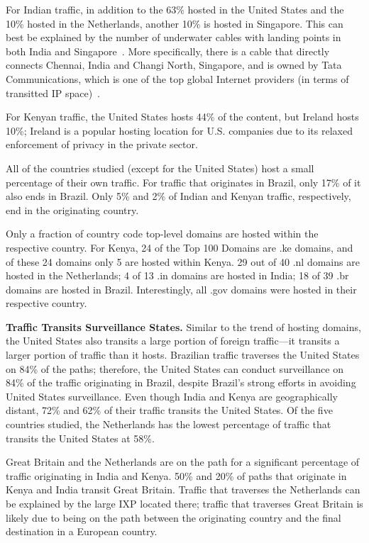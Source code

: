 For Indian traffic, in addition to the 63\% hosted in the United States and the 10\% hosted in the Netherlands, another 10\% is hosted in Singapore.  This can best be explained by the number of underwater cables with landing points in both India and Singapore~\cite{cablemap}.  More specifically, there is a cable that directly connects Chennai, India and Changi North, Singapore, and is owned by Tata Communications, which is one of the top global Internet providers (in terms of transitted IP space)~\cite{bakers}.  

For Kenyan traffic, the United States hosts 44\% of the content, but Ireland hosts 10\%; Ireland is a popular hosting location for U.S. companies due to its relaxed enforcement of privacy in the private sector.  

All of the countries studied (except for the United States) host a small percentage of their own traffic.  For traffic that originates in Brazil, only 17\% of it also ends in Brazil.  Only 5\% and 2\% of Indian and Kenyan traffic, respectively, end in the originating country.  

Only a fraction of country code top-level domains are hosted within the respective country.  For Kenya, 24 of the Top 100 Domains are .ke domains, and of these 24 domains only 5 are hosted within Kenya.  29 out of 40 .nl domains are hosted in the Netherlands; 4 of 13 .in domains are hosted in India; 18 of 39 .br domains are hosted in Brazil.  Interestingly, all .gov domains were hosted in their respective country.

{\bf Traffic Transits Surveillance States.}
Similar to the trend of hosting domains, the United States also transits a large portion of foreign traffic---it transits a larger portion of traffic than it hosts.  Brazilian traffic traverses the United States on 84\% of the paths; therefore, the United States can conduct surveillance on 84\% of the traffic originating in Brazil, despite Brazil's strong efforts in avoiding United States surveillance.  Even though India and Kenya are geographically distant, 72\% and 62\% of their traffic transits the United States.  Of the five countries studied, the Netherlands has the lowest percentage of traffic that transits the United States at 58\%.  

Great Britain and the Netherlands are on the path for a significant percentage of traffic originating in India and Kenya.  50\% and 20\% of paths that originate in Kenya and India transit Great Britain.  Traffic that traverses the Netherlands can be explained by the large IXP located there; traffic that traverses Great Britain is likely due to being on the path between the originating country and the final destination in a European country.

